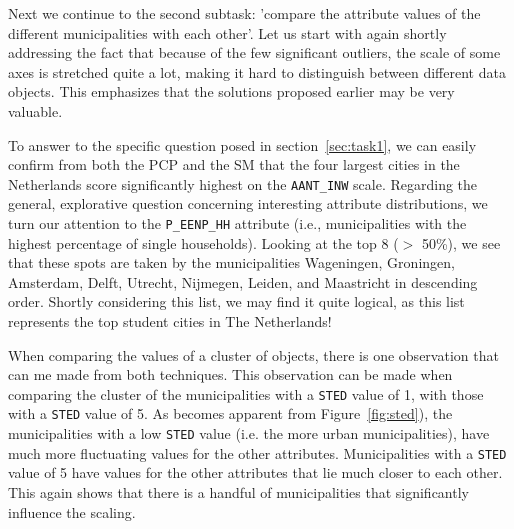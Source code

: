 Next we continue to the second subtask: 'compare the attribute values of the different municipalities with each other'. Let us start with again shortly addressing the fact that because of the few significant outliers, the scale of some axes is stretched quite a lot, making it hard to distinguish between different data objects. This emphasizes that the solutions proposed earlier may be very valuable.

To answer to the specific question posed in section~\ref{sec:task1}, we can easily confirm from both the PCP and the SM that the four largest cities in the Netherlands score significantly highest on the \texttt{AANT\_INW} scale. Regarding the general, explorative question concerning interesting attribute distributions, we turn our attention to the \texttt{P\_EENP\_HH} attribute (i.e., municipalities with the highest percentage of single households). Looking at the top 8 ($>$ 50\%), we see that these spots are taken by the municipalities Wageningen, Groningen, Amsterdam, Delft, Utrecht, Nijmegen, Leiden, and Maastricht in descending order. Shortly considering this list, we may find it quite logical, as this list represents the top student cities in The Netherlands!

When comparing the values of a cluster of objects, there is one observation that can me made from both techniques. This observation can be made when comparing the cluster of the municipalities with a \texttt{STED} value of 1, with those with a \texttt{STED} value of 5. As becomes apparent from Figure~\ref{fig:sted}), the municipalities with a low \texttt{STED} value (i.e. the more urban municipalities), have much more fluctuating values for the other attributes. Municipalities with a \texttt{STED} value of 5 have values for the other attributes that lie much closer to each other. This again shows that there is a handful of municipalities that significantly influence the scaling.


